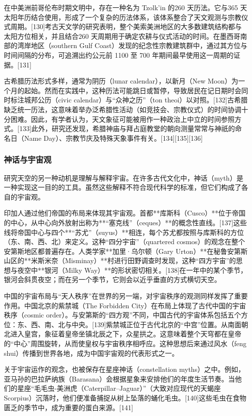 在中美洲前哥伦布时期文明中，存在一种名为 Tzolk’in 的260 天历法。它与365 天太阳年历结合使用，形成了一个复杂的历法体系，该体系整合了天文观测与宗教仪式周期。[130]考古天文学的研究表明，整个美索美洲地区的大多数建筑结构都与太阳方位相关，并且结合260 天周期用于确定农耕与仪式活动的时间。在墨西哥南部的湾岸地区（southern Gulf Coast）发现的纪念性宗教建筑群中，通过其方位与时间间隔的分布，可追溯出约公元前 1100 至 700 年期间最早使用这一周期的证据。[131]

古希腊历法形式多样，通常为阴历（lunar calendar），以新月（New Moon）为一个月的起始。然而在实践中，这种历法可能跳日或暂停，导致居民在记日期时会同时标注城邦公历（civic calendar）与“众神之历”（ton theoi）以对照。[132]古希腊缺乏统一历法，这意味着举办泛希腊性活动（如竞技会、宗教仪式）的时间协调十分困难。因此，有学者认为，天文象征可能被用作一种政治上中立的时间参照方式。[133]此外，研究还发现，希腊神庙与拜占庭教堂的朝向测量常常与神祇的命名日（Name Day）、宗教节庆及特殊天象事件有关。[134][135][136]
\subsubsection{神话与宇宙观}
研究天空的另一种动机是理解与解释宇宙。在许多古代文化中，神话（myth）是一种实现这一目的的工具。虽然这些解释不符合现代科学的标准，但它们构成了各自的宇宙观。

印加人通过他们帝国的布局来体现其宇宙观。首都**库斯科（Cusco）**位于帝国的中心，从中心向外放射出称为**“塞克线”（ceques）**的概念性直线。[137]这些线将帝国中心与四个**“苏尤”（suyus）**相连，每个苏尤都按照与库斯科的方位（东、南、西、北）来定义。这种“四分宇宙”（quartered cosmos）的观念在整个安第斯地区都普遍存在。人类学家**加里·乌尔顿（Gary Urton）**在秘鲁安第斯山区的**米斯米奈（Misminay）**村进行田野调查时发现，这种“四方宇宙”的思想与夜空中**银河（Milky Way）**的形状密切相关。[138]在一年中的某个季节，银河会斜贯夜空；而在另一个季节，它则会以近乎垂直的方式横切天空。

中国的宇宙布局与“天人秩序”在世界的另一端，对宇宙秩序的观测同样发挥了重要作用。中国北京的紫禁城（The Forbidden City）在布局上体现了古代中国的宇宙秩序（cosmic order）。与安第斯的“四方观”不同，中国古代的宇宙体系包括五个方位：东、西、南、北与中央。[139]紫禁城正位于古代北京的“中宫”位置。从南面朝北进入皇宫，象征着皇帝坐镇北辰之下，众星拱之。这意味着整个天穹都在皇帝的“中心”周围旋转，从而使皇权与宇宙秩序相呼应。这种思想后来通过风水（feng shui）传播到世界各地，成为中国宇宙观的代表形式之一。

关于宇宙运作的观念，也被保存在星座神话（constellation myths）之中。例如，亚马孙的巴拉萨纳族（Barasana）会根据星象来安排他们的年度生活节奏。当他们的星座“毛毛虫-美洲虎（Caterpillar–Jaguar）”（大致对应现代的天蝎座 Scorpius）沉落时，他们便准备捕捉从树上坠落的蛹化毛虫。[140]这些毛虫在食物匮乏的季节中，成为重要的蛋白来源。[141]

